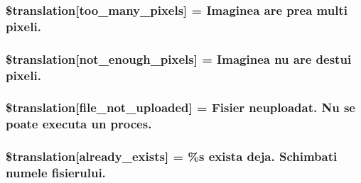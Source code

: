 \subsubsection[{\$translation}]{\setlength{\rightskip}{0pt plus 5cm}\$translation\mbox{[}\textquotesingle{}too\+\_\+many\+\_\+pixels\textquotesingle{}\mbox{]} = \textquotesingle{}Imaginea are prea multi pixeli.\textquotesingle{}}\label{class_8upload_8ro___r_o_8php_aa4051ef64e94a3f8295c63cf85544016}
\hypertarget{class_8upload_8ro___r_o_8php_a1fe342c27ce61f4ff4e0120ba647033e}{}
\subsubsection[{\$translation}]{\setlength{\rightskip}{0pt plus 5cm}\$translation\mbox{[}\textquotesingle{}not\+\_\+enough\+\_\+pixels\textquotesingle{}\mbox{]} = \textquotesingle{}Imaginea nu are destui pixeli.\textquotesingle{}}\label{class_8upload_8ro___r_o_8php_a1fe342c27ce61f4ff4e0120ba647033e}
\hypertarget{class_8upload_8ro___r_o_8php_a4ce76e7be0b3a03c2b47f6d70c21832e}{}
\subsubsection[{\$translation}]{\setlength{\rightskip}{0pt plus 5cm}\$translation\mbox{[}\textquotesingle{}file\+\_\+not\+\_\+uploaded\textquotesingle{}\mbox{]} = \textquotesingle{}Fisier neuploadat. Nu se poate executa un proces.\textquotesingle{}}\label{class_8upload_8ro___r_o_8php_a4ce76e7be0b3a03c2b47f6d70c21832e}
\hypertarget{class_8upload_8ro___r_o_8php_afd84e910217f04139f567c41e292afa5}{}
\subsubsection[{\$translation}]{\setlength{\rightskip}{0pt plus 5cm}\$translation\mbox{[}\textquotesingle{}already\+\_\+exists\textquotesingle{}\mbox{]} = \textquotesingle{}\%s exista deja. Schimbati numele fisierului.\textquotesingle{}}\label{class_8upload_8ro___r_o_8php_afd84e910217f04139f567c41e292afa5}
\hypertarget{class_8upload_8ro___r_o_8php_ab0fa87a88aba2624004581eed0633325}{}
